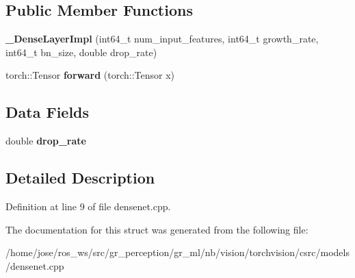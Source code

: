 \subsection*{Public Member Functions}
\begin{DoxyCompactItemize}
\item 
\mbox{\label{structvision_1_1models_1_1__DenseLayerImpl_ae5f0f90dbc2c21de7b4dfeacd31bb678}} 
{\bfseries \+\_\+\+Dense\+Layer\+Impl} (int64\+\_\+t num\+\_\+input\+\_\+features, int64\+\_\+t growth\+\_\+rate, int64\+\_\+t bn\+\_\+size, double drop\+\_\+rate)
\item 
\mbox{\label{structvision_1_1models_1_1__DenseLayerImpl_a8aaef3408142548b005531756209aad4}} 
torch\+::\+Tensor {\bfseries forward} (torch\+::\+Tensor x)
\end{DoxyCompactItemize}
\subsection*{Data Fields}
\begin{DoxyCompactItemize}
\item 
\mbox{\label{structvision_1_1models_1_1__DenseLayerImpl_a3fe117676f9b89df19f266bf77d0c713}} 
double {\bfseries drop\+\_\+rate}
\end{DoxyCompactItemize}


\subsection{Detailed Description}


Definition at line 9 of file densenet.\+cpp.



The documentation for this struct was generated from the following file\+:\begin{DoxyCompactItemize}
\item 
/home/jose/ros\+\_\+ws/src/gr\+\_\+perception/gr\+\_\+ml/nb/vision/torchvision/csrc/models/densenet.\+cpp\end{DoxyCompactItemize}
